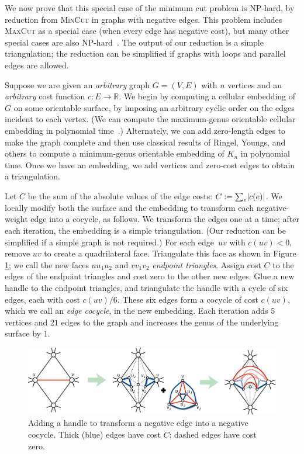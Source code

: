 \documentclass[11pt,twoside]{article}
\def\Real{\mathbb{R}}
\begin{document}
{We now prove that this special case of the minimum cut problem is {NP}-hard, by  reduction from \textsc{MinCut} in graphs with negative edges.  This problem includes \textsc{MaxCut} as a special case (when every edge has negative cost), but many other special cases are also {NP}-hard~\cite{mrr-edofm-03}.  The output of our reduction is a simple triangulation; the reduction can be simplified if graphs with loops and parallel edges are allowed.

Suppose we are given an \emph{arbitrary} graph $G = (V,E)$ with $n$ vertices and an \emph{arbitrary} cost function $c\colon E\to \Real$.  We begin by computing a cellular embedding of $G$ on some orientable surface, by imposing an arbitrary cyclic order on the edges incident to each vertex.
(We can compute the maximum-genus orientable cellular embedding  in polynomial time~\cite{fgm-fmggi-88}.)  Alternately, we can add zero-length edges to make the graph complete and then use classical results of Ringel, Youngs, and others \cite{ry-shmcp-68,r-mct-74} to compute a minimum-genus orientable embedding of $K_n$ in polynomial time.  Once we have an embedding, we add vertices and zero-cost edges to obtain a triangulation.

Let $C$ be the sum of the absolute values of the edge costs: $C:= \sum_e \mathopen| c(e) \mathclose|$.  We locally modify both the surface and the embedding to transform each negative-weight edge into a cocycle, as follows.  We transform the edges one at a time; after each iteration, the embedding is a simple triangulation.  (Our reduction can be simplified if a simple graph is not required.)  For each edge~$uv$ with $c(uv)<0$, remove $uv$ to create a quadrilateral face.  Triangulate this face as shown in Figure \ref{fig:addhandle}; we call the new faces $uu_1u_2$ and $vv_1v_2$ \emph{endpoint triangles}.  Assign cost $C$ to the edges of the endpoint triangles and cost zero to the other new edges. Glue a new handle to the endpoint triangles, and triangulate the handle with a cycle of six edges, each with cost $c(uv)/6$.  These six edges form a cocycle of cost $c(uv)$, which we call an \emph{edge cocycle}, in the new embedding.  Each iteration adds $5$ vertices and $21$ edges to the graph and increases the genus of the underlying surface by $1$.

\begin{figure}[hbt]
\centering\includegraphics[scale=0.4]{Fig/addhandle3}
\caption{Adding a handle to transform a negative edge into a negative cocycle.  Thick (blue) edges have cost $C$; dashed edges have cost zero.}
\label{fig:addhandle}
\end{figure}

}
\end{document}
